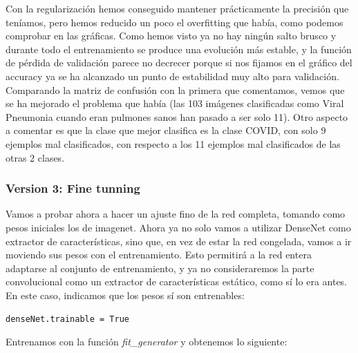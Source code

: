 \documentclass[11pt,a4paper]{article}
\theoremstyle{definition}
\begin{document}
Con la regularización hemos conseguido mantener prácticamente la precisión que teníamos, pero hemos reducido un poco el overfitting que había, como podemos comprobar en las gráficas.  Como hemos visto ya no hay ningún salto brusco y durante todo el entrenamiento se produce una evolución más estable, y la función de pérdida de validación parece no decrecer porque si nos fijamos en el gráfico del accuracy ya se ha alcanzado un punto de estabilidad muy alto para validación.\\

Comparando la matriz de confusión con la primera que comentamos, vemos que se ha mejorado el problema que había (las 103 imágenes clasificadas como Viral Pneumonia cuando eran pulmones sanos han pasado a ser solo 11). Otro aspecto a comentar es que la clase que mejor clasifica es la clase COVID, con solo 9 ejemplos mal clasificados, con respecto a los 11 ejemplos mal clasificados de las otras 2 clases.

\subsubsection{Version 3: Fine tunning}

Vamos a probar ahora a hacer un ajuste fino de la red completa, tomando como pesos iniciales los de imagenet. Ahora ya no solo vamos a utilizar DenseNet como extractor de características, sino que, en vez de estar la red congelada, vamos a ir moviendo sus pesos con el entrenamiento. Esto permitirá a la red entera adaptarse al conjunto de entrenamiento, y ya no consideraremos la parte convolucional como un extractor de características estático, como sí lo era antes.\\

En este caso, indicamos que los pesos sí son entrenables:

\begin{lstlisting}
denseNet.trainable = True
\end{lstlisting}

Entrenamos con la función \textit{fit\_generator} y obtenemos lo siguiente:
\end{document}
